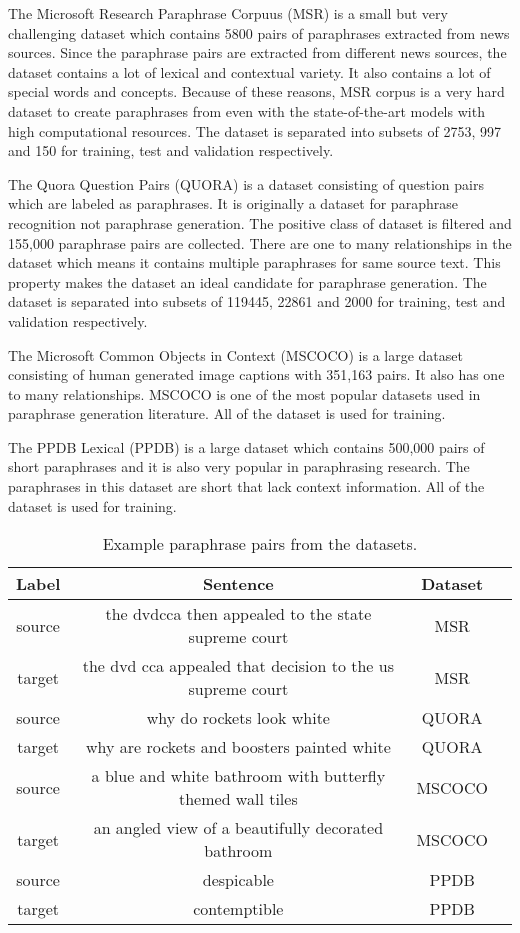 The Microsoft Research Paraphrase Corpuus (MSR) \cite{msrp} is a small but very challenging dataset which contains 5800 pairs of paraphrases extracted from news sources. Since the paraphrase pairs are extracted from different news sources, the dataset contains a lot of lexical and contextual variety. It also contains a lot of special words and concepts. Because of these reasons, MSR corpus is a very hard dataset to create paraphrases from even with the state-of-the-art models with high computational resources. The dataset is separated into subsets of 2753, 997 and 150 for training, test and validation respectively.

The Quora Question Pairs (QUORA) is a dataset consisting of question pairs which are labeled as paraphrases. It is originally a dataset for paraphrase recognition not paraphrase generation. The positive class of dataset is filtered and 155,000 paraphrase pairs are collected. There are one to many relationships in the dataset which means it contains multiple paraphrases for same source text. This property makes the dataset an ideal candidate for paraphrase generation. The dataset is separated into subsets of 119445, 22861 and 2000 for training, test and validation respectively.

The Microsoft Common Objects in Context (MSCOCO) \cite{mscoco} is a large dataset consisting of human generated image captions with 351,163 pairs. It also has one to many relationships. MSCOCO is one of the most popular datasets used in paraphrase generation literature. All of the dataset is used for training.

The PPDB Lexical (PPDB) \cite{ppdb} is a large dataset which contains 500,000 pairs of short paraphrases and it is also very popular in paraphrasing research. The paraphrases in this dataset are short that lack context information. All of the dataset is used for training.

\begin{table}
\small
 \begin{tabular}{||c c c c||} 
 \hline
 Label & Sentence & Dataset & \\ [0.5ex] 
 \hline
 source & the dvdcca then appealed to the state supreme court & MSR & \\
 \hline
 target & the dvd cca appealed that decision to the us supreme court & MSR & \\
  \hline
 source & why do rockets look white & QUORA & \\
 \hline
 target & why are rockets and boosters painted white & QUORA & \\
 \hline
 source & a blue and white bathroom with butterfly themed wall tiles & MSCOCO & \\
 \hline
 target & an angled view of a beautifully decorated bathroom & MSCOCO & \\
 \hline
 source & despicable & PPDB & \\
 \hline
 target & contemptible & PPDB & \\
 \hline
\end{tabular}
\caption{Example paraphrase pairs from the datasets.}
\end{table}



